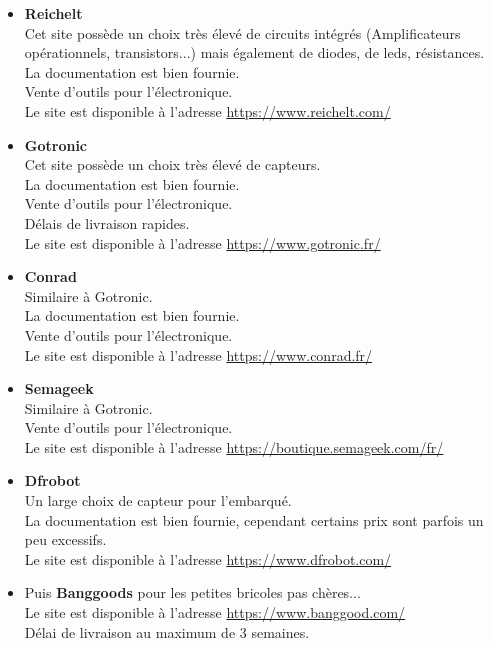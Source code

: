 \documentclass[12pt]{report}
\newcommand{\Circle}{$\circ$}
\newenvironment{items}[2]
{      
        \begin{itemize}[font=\color{#1}, label=#2]  
    }
    { 
        \end{itemize}
}%
\renewcommand{\bold}[1]{\textbf{#1}}
\begin{document}
  \begin{items}{blue}{\Circle}
    \item \bold{Reichelt} \\ Cet site possède un choix très élevé de circuits intégrés (Amplificateurs opérationnels, transistors...) mais également de diodes, de leds, résistances.\\
    La documentation est bien fournie.\\
    Vente d'outils pour l'électronique.\\
    Le site est disponible à l'adresse \url{https://www.reichelt.com/}

    \item \bold{Gotronic} \\ Cet site possède un choix très élevé de capteurs.\\
    La documentation est bien fournie.\\
    Vente d'outils pour l'électronique.\\
    Délais de livraison rapides.\\
    Le site est disponible à l'adresse \url{https://www.gotronic.fr/}

    \item \bold{Conrad} \\ Similaire à Gotronic.\\
    La documentation est bien fournie.\\
    Vente d'outils pour l'électronique.\\
    Le site est disponible à l'adresse \url{https://www.conrad.fr/}

    \item \bold{Semageek} \\ Similaire à Gotronic.\\
    Vente d'outils pour l'électronique.\\
    Le site est disponible à l'adresse \url{https://boutique.semageek.com/fr/}


    \item \bold{Dfrobot} \\ Un large choix de capteur pour l'embarqué.\\
    La documentation est bien fournie, cependant certains prix sont parfois un peu excessifs.\\
    Le site est disponible à l'adresse \url{https://www.dfrobot.com/}

    \item Puis \bold{Banggoods} pour les petites bricoles pas chères... \\
    Le site est disponible à l'adresse \url{https://www.banggood.com/}\\
    Délai de livraison au maximum de 3 semaines.


\end{items}
\end{document}
